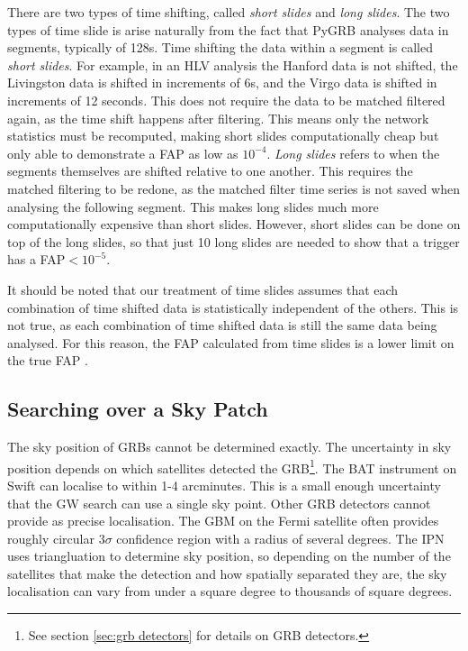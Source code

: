 \documentclass[11pt]{cuthesis}
\begin{document}
There are two types of time shifting, called \textit{short slides} and \textit{long slides}. The two types of time slide is arise naturally from the fact that PyGRB analyses data in segments, typically of 128s. Time shifting the data within a segment is called \textit{short slides}. For example, in an HLV analysis the Hanford data is not shifted, the Livingston data is shifted in increments of 6s, and the Virgo data is shifted in increments of 12 seconds. This does not require the data to be matched filtered again, as the time shift happens after filtering. This means only the network statistics must be recomputed, making short slides computationally cheap but only able to demonstrate a FAP as low as $10^{-4}$. \textit{Long slides} refers to when the segments themselves are shifted relative to one another. This requires the matched filtering to be redone, as the matched filter time series is not saved when analysing the following segment. This makes long slides much more computationally expensive than short slides. However, short slides can be done on top of the long slides, so that just 10 long slides are needed to show that a trigger has a FAP$<10^{-5}$.

It should be noted that our treatment of time slides assumes that each combination of time shifted data is statistically independent of the others. This is not true, as each combination of time shifted data is still the same data being analysed. For this reason, the FAP calculated from time slides is a lower limit on the true FAP \cite{was_2009} \cite{was_2010}.


\subsection{Searching over a Sky Patch} \label{sec:sky grid}
The sky position of GRBs cannot be determined exactly. The uncertainty in sky position depends on which satellites detected the GRB\footnote{See section \ref{sec:grb detectors} for details on GRB detectors.}. The BAT instrument on Swift can localise to within 1-4 arcminutes\cite{swift_loc}. This is a small enough uncertainty that the GW search can use a single sky point\cite{gw_loc}. Other GRB detectors cannot provide as precise localisation. The GBM on the Fermi satellite often provides  roughly circular 3$\sigma$ confidence region with a radius of several degrees\cite{fermi_loc}. The IPN uses triangluation to determine sky position, so depending on the number of the satellites that make the detection and how spatially separated they are, the sky localisation can vary from under a square degree to thousands of square degrees. 
\end{document}
